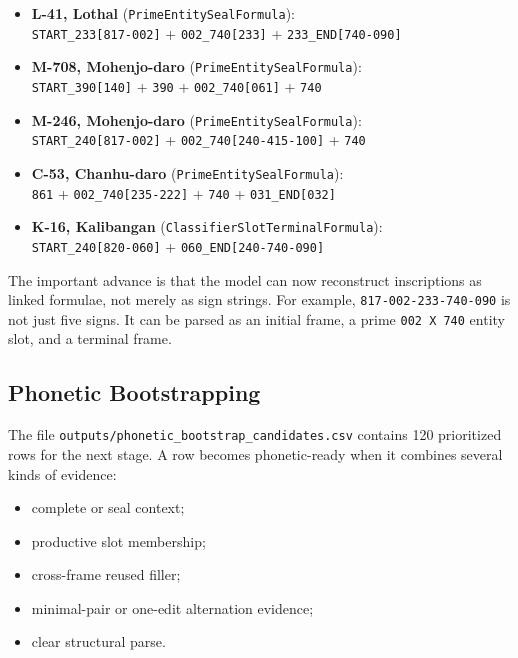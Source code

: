 \begin{itemize}
  \item \textbf{L-41, Lothal} (\texttt{PrimeEntitySealFormula}):\\
  {\footnotesize\texttt{START\_233[817-002]} + \texttt{002\_740[233]} + \texttt{233\_END[740-090]}}
  \item \textbf{M-708, Mohenjo-daro} (\texttt{PrimeEntitySealFormula}):\\
  {\footnotesize\texttt{START\_390[140]} + \texttt{390} + \texttt{002\_740[061]} + \texttt{740}}
  \item \textbf{M-246, Mohenjo-daro} (\texttt{PrimeEntitySealFormula}):\\
  {\footnotesize\texttt{START\_240[817-002]} + \texttt{002\_740[240-415-100]} + \texttt{740}}
  \item \textbf{C-53, Chanhu-daro} (\texttt{PrimeEntitySealFormula}):\\
  {\footnotesize\texttt{861} + \texttt{002\_740[235-222]} + \texttt{740} + \texttt{031\_END[032]}}
  \item \textbf{K-16, Kalibangan} (\texttt{ClassifierSlotTerminalFormula}):\\
  {\footnotesize\texttt{START\_240[820-060]} + \texttt{060\_END[240-740-090]}}
\end{itemize}

The important advance is that the model can now reconstruct inscriptions as linked formulae, not merely as sign strings. For example, \texttt{817-002-233-740-090} is not just five signs. It can be parsed as an initial frame, a prime \texttt{002 X 740} entity slot, and a terminal frame.

\subsection{Phonetic Bootstrapping}

The file \texttt{outputs/phonetic\_bootstrap\_candidates.csv} contains 120 prioritized rows for the next stage. A row becomes phonetic-ready when it combines several kinds of evidence:

\begin{itemize}
  \item complete or seal context;
  \item productive slot membership;
  \item cross-frame reused filler;
  \item minimal-pair or one-edit alternation evidence;
  \item clear structural parse.
\end{itemize}


